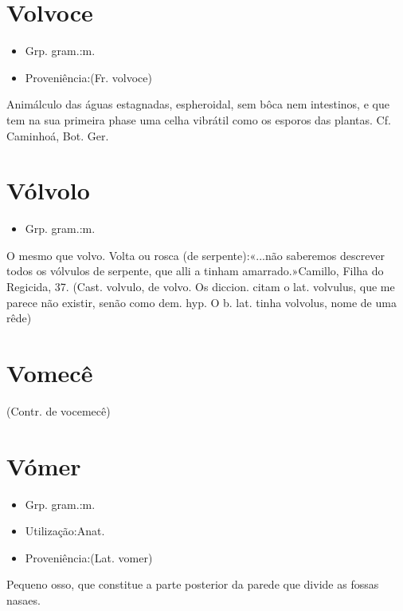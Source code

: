 \documentclass{article}
\begin{document}
\section{Volvoce}
\begin{itemize}
\item {Grp. gram.:m.}
\end{itemize}
\begin{itemize}
\item {Proveniência:(Fr. \textunderscore volvoce\textunderscore )}
\end{itemize}
Animálculo das águas estagnadas, espheroidal, sem bôca nem intestinos, e que tem na sua primeira phase uma celha vibrátil como os esporos das plantas. Cf. Caminhoá, \textunderscore Bot. Ger.\textunderscore 
\section{Vólvolo}
\begin{itemize}
\item {Grp. gram.:m.}
\end{itemize}
O mesmo que \textunderscore volvo\textunderscore .
Volta ou rosca (de serpente):«\textunderscore ...não saberemos descrever todos os vólvulos de serpente, que alli a tinham amarrado.\textunderscore »Camillo, \textunderscore Filha do Regicida\textunderscore , 37.
(Cast. \textunderscore volvulo\textunderscore , de \textunderscore volvo\textunderscore . Os diccion. citam o lat. \textunderscore volvulus\textunderscore , que me parece não existir, senão como dem. hyp. O b. lat. tinha \textunderscore volvolus\textunderscore , nome de uma rêde)
\section{Vomecê}
(Contr. de \textunderscore vocemecê\textunderscore )
\section{Vómer}
\begin{itemize}
\item {Grp. gram.:m.}
\end{itemize}
\begin{itemize}
\item {Utilização:Anat.}
\end{itemize}
\begin{itemize}
\item {Proveniência:(Lat. \textunderscore vomer\textunderscore )}
\end{itemize}
Pequeno osso, que constitue a parte posterior da parede que divide as fossas nasaes.
\end{document}
